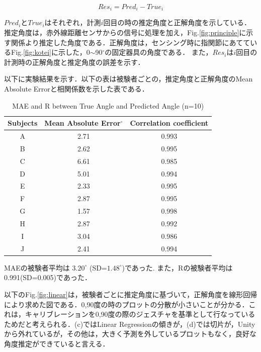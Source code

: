 \begin{equation}
Res_i = Pred_i - True_i
\label{eq:res}
\end{equation}

$Pred_iとTrue_i$はそれぞれ，計測$i$回目の時の推定角度と正解角度を示している．推定角度は，赤外線距離センサからの信号に処理を加え，Fig.\ref{fig:principle}に示す関係より推定した角度である．正解角度は，センシング時に指関節にあてているFig.\ref{fig:kotei}に示した，0$\sim$90$^\circ$の固定器具の角度である．
また，$Res_i$は$i$回目の計測時の正解角度と推定角度の誤差を示す．

以下に実験結果を示す．以下の表は被験者ごとの，推定角度と正解角度のMean Absolute Errorと相関係数を示した表である．


\begin{table}[H]
  \caption{MAE and R between{}
True Angle and Predicted Angle (n=10)}
  \label{table:data_type}
  \centering
  \begin{tabular}{ccc}
    \hline
    Subjects  & Mean Absolute Error$^\circ$  & Correlation coefficient  \\
    \hline \hline
    A  & 2.71 & 0.993\\
    B  & 2.62 & 0.995\\
    C  & 6.61 & 0.985\\
    D  & 5.01 & 0.994\\
    E  & 2.33 & 0.995\\ 
    F  & 2.87 & 0.995\\
    G  & 1.57 & 0.998\\
    H  & 2.87 & 0.992\\
    I  & 3.04 & 0.986\\
    J  & 2.41 & 0.994\\
    \hline
  \end{tabular}
\end{table}

MAEの被験者平均は $3.20^\circ$ (SD=$1.48^\circ$)であった.
また，Rの被験者平均は0.991(SD=0.005)であった．

以下のFig.\ref{fig:linear}は，被験者ごとに推定角度に基づいて，正解角度を線形回帰により求めた図である．0,90度の時のプロットの分散が小さいことが分かる．これは，キャリブレーションを0,90度の際のジェスチャを基準として行なっているためだと考えられる．(c)ではLinear Regressionの傾きが，(d)では切片が，Unityから外れているが，その他は，大きく予測を外しているプロットもなく，良好な角度推定ができていると言える．


